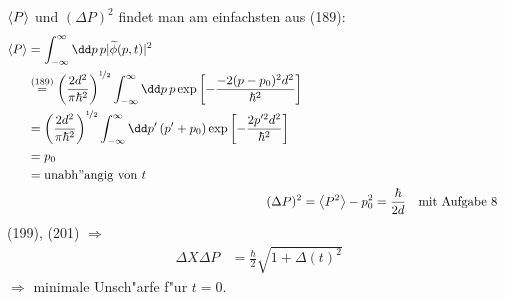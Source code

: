 \documentclass[a4paper]{scrartcl}
\begin{document}
{$\Braket P$ und $(\Delta P)^2$ findet man am einfachsten aus (189):
\begin{align}
\begin{split}
\Braket P & = \int_{-\infty}^\infty \dd p \, p \vert \widetilde \phi(p,t) \vert^2 \\
& \stackrel{(189)}=  \left( \frac{ 2d^2}{\pi \hbar^2} \right) ^{\nicefrac 1 2} \int_{-\infty}^\infty \dd p \, p \exp \left[ - \frac{ - 2(p - p_0)^2 d^2}{\hbar^2} \right] \\
& = \left( \frac{ 2d^2}{\pi \hbar^2} \right) ^{\nicefrac 1 2} \int_{-\infty}^\infty \dd p' \, ( p' + p_0 ) \exp \left[ - \frac{ 2 p'^2 d^2}{\hbar^2} \right] \\
& = p_0 \\
& = \mathrm{unabh"angig \ von \ } t
\end{split} \\
(\Delta P)^2 & = \Braket{ P^2} - p_0^2 = \frac \hbar {2d} \quad \mathrm{mit \ Aufgabe \ 8}
\end{align}
(199), (201) $\Longrightarrow$
\begin{align}
\Delta X \Delta P & = \frac \hbar 2 \sqrt{ 1 + \Delta(t)^2}
\end{align}
$\Longrightarrow$ minimale Unsch"arfe f"ur $t=0$.

}
\end{document}
